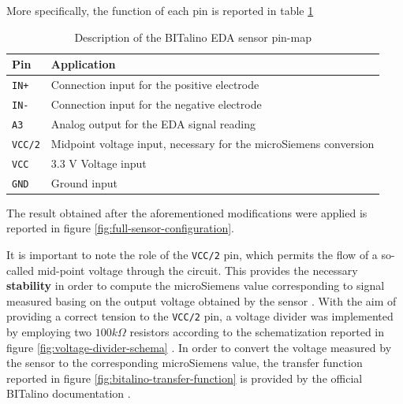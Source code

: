 More specifically, the function of each pin is reported in table \ref{toc:bitalino-pinmap-table}

\begin{table}[H]
\centering
\begin{tabular}{ll}
    \hline
    \textbf{Pin}            & \textbf{Application} \\
    \hline
    \texttt{IN+}            & Connection input for the positive electrode \\
    \texttt{IN-}            & Connection input for the negative electrode \\
    \texttt{A3}             & Analog output for the EDA signal reading \\
    \texttt{VCC/2}          & Midpoint voltage input, necessary for the microSiemens conversion \\
    \texttt{VCC}            & 3.3 V Voltage input \\
    \texttt{GND}            & Ground input \\
    \hline
\end{tabular}
\caption{Description of the BITalino EDA sensor pin-map}
\label{toc:bitalino-pinmap-table}
\end{table}

\vspace{1cm}

The result obtained after the aforementioned modifications were applied is reported in figure \ref{fig:full-sensor-configuration}. 

It is important to note the role of the \texttt{VCC/2} pin, which permits the flow of a so-called mid-point voltage through the circuit. This provides the necessary \textbf{stability} in order to compute the microSiemens value corresponding to signal measured basing on the output voltage obtained by the sensor \cite{bitalino-midpoint-voltage}. With the aim of providing a correct tension to the \texttt{VCC/2} pin, a voltage divider was implemented by employing two $100 k\Omega$ resistors according to the schematization reported in figure \ref{fig:voltage-divider-schema} . In order to convert the voltage measured by the sensor to the corresponding microSiemens value, the transfer function reported in figure \ref{fig:bitalino-transfer-function} is provided by the official BITalino documentation \cite{bitalino-general}.

